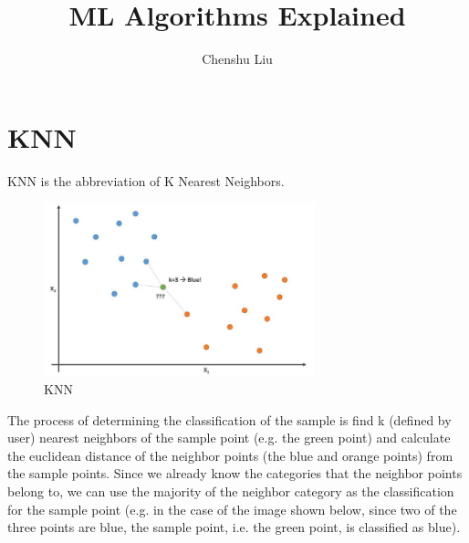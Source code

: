 \documentclass[12pt]{article}
\title{ML Algorithms Explained}
\author{Chenshu Liu}
\begin{document}
\maketitle
\tableofcontents
\newpage

\section{KNN}
KNN is the abbreviation of K Nearest Neighbors.
\begin{figure}[htbp]
\begin{center}
\includegraphics[width = 0.7\textwidth]{Images/KNN.jpeg}
\caption{KNN}
\label{KNN}
\end{center}
\end{figure}
The process of determining the classification of the sample is find k (defined by user) nearest neighbors of the sample point (e.g. the green point) and calculate the euclidean distance of the neighbor points (the blue and orange points) from the sample points. Since we already know the categories that the neighbor points belong to, we can use the majority of the neighbor category as the classification for the sample point (e.g. in the case of the image shown below, since two of the three points are blue, the sample point, i.e. the green point, is classified as blue).
\newpage
\end{document}
